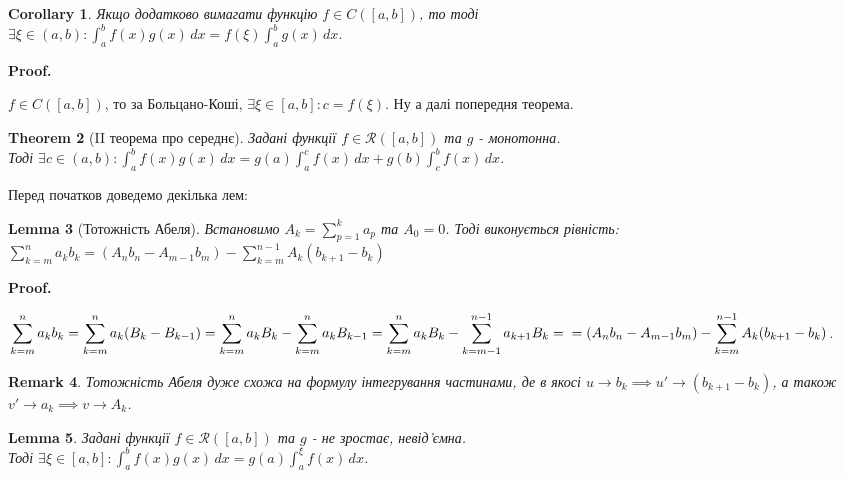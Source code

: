 \documentclass[a4paper, 10pt]{article}
\makeatletter
\def\huge{\displaystyle}
\def\qed{$\blacksquare$}
\theoremstyle{theoremdd}
\newtheorem{theorem}{Theorem}[subsection]
\theoremstyle{theoremdd}
\theoremstyle{theoremdd}
\theoremstyle{theoremdd}
\theoremstyle{theoremdd}
\theoremstyle{theoremdd}
\newtheorem{remark}[theorem]{Remark}
\theoremstyle{theoremdd}
\newtheorem{lemma}[theorem]{Lemma}
\theoremstyle{theoremdd}
\newtheorem{corollary}[theorem]{Corollary}
\renewenvironment{proof}[1][Proof.\\]{\par
\pushQED{\hfill \qed}%
\normalfont \topsep6\p@\@plus6\p@\relax
\trivlist
\item\relax
{\bfseries
#1\@addpunct{.}}\hspace\labelsep\ignorespaces
}{%
\popQED\endtrivlist\@endpefalse
}
\makeatother
\begin{document}
\begin{corollary}
Якщо додатково вимагати функцію $f \in C([a,b])$, то тоді \\ $\exists \xi \in (a,b): \huge\int_a^b f(x)g(x)\,dx = f(\xi) \int_a^b g(x)\,dx$.
\end{corollary}

\begin{proof}
$f \in C([a,b])$, то за Больцано-Коші, $\exists \xi \in [a,b]: c = f(\xi)$. Ну а далі попередня теорема.
\end{proof}

\begin{theorem}[II теорема про середнє]
Задані функції $f\in \mathcal{R}([a,b])$ та $g$ - монотонна. \\
Тоді $\exists c \in (a,b): \huge\int_a^b f(x)g(x)\,dx = g(a)\int_a^c f(x)\,dx + g(b) \int_c^b f(x)\,dx$.
\end{theorem}

Перед початков доведемо декілька лем:
\begin{lemma}[Тотожність Абеля]
Встановимо $A_k = \huge\sum_{p=1}^k a_p$ та $A_0 = 0$. Тоді виконується рівність:\\
$\huge\sum_{k=m}^n a_k b_k = \left(A_n b_n - A_{m-1} b_m \right) - \huge\sum_{k=m}^{n-1} A_k(b_{k+1}-b_{k})$
\end{lemma}

\begin{proof}
$\huge\sum_{k=m}^n a_kb_k = \sum_{k=m}^n a_k (B_{k}-B_{k-1}) = \sum_{k=m}^n a_k B_k - \sum_{k=m}^n a_k B_{k-1} = \sum_{k=m}^n a_k B_k - \sum_{k=m-1}^{n-1} a_{k+1} B_{k} = \\ = \left(A_n b_n - A_{m-1} b_m \right) - \huge\sum_{k=m}^{n-1} A_k(b_{k+1}-b_{k})$.
\end{proof}

\begin{remark}
Тотожність Абеля дуже схожа на формулу інтегрування частинами, де в якосі $u \to b_k \implies u' \to (b_{k+1}-b_k)$, а також $v' \to a_k \implies v \to A_k$.
\end{remark}

\begin{lemma}
Задані функції $f \in \mathcal{R}([a,b])$ та $g$ - не зростає, невід'ємна. \\
Тоді $\exists \xi \in [a,b]: \huge\int_a^b f(x)g(x)\,dx = g(a) \int_a^\xi f(x)\,dx$.
\end{lemma}
\end{document}
